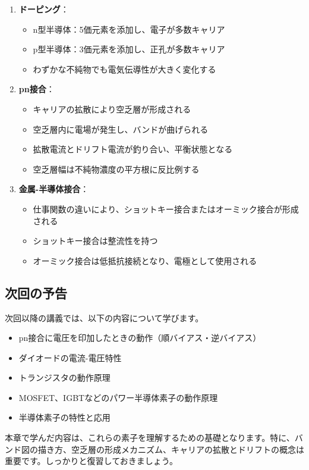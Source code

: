 \begin{enumerate}
\item \textbf{ドーピング}：
\begin{itemize}
\item n型半導体：5価元素を添加し、電子が多数キャリア
\item p型半導体：3価元素を添加し、正孔が多数キャリア
\item わずかな不純物でも電気伝導性が大きく変化する
\end{itemize}

\item \textbf{pn接合}：
\begin{itemize}
\item キャリアの拡散により空乏層が形成される
\item 空乏層内に電場が発生し、バンドが曲げられる
\item 拡散電流とドリフト電流が釣り合い、平衡状態となる
\item 空乏層幅は不純物濃度の平方根に反比例する
\end{itemize}

\item \textbf{金属-半導体接合}：
\begin{itemize}
\item 仕事関数の違いにより、ショットキー接合またはオーミック接合が形成される
\item ショットキー接合は整流性を持つ
\item オーミック接合は低抵抗接続となり、電極として使用される
\end{itemize}
\end{enumerate}

\subsection{次回の予告}

次回以降の講義では、以下の内容について学びます。

\begin{itemize}
\item pn接合に電圧を印加したときの動作（順バイアス・逆バイアス）
\item ダイオードの電流-電圧特性
\item トランジスタの動作原理
\item MOSFET、IGBTなどのパワー半導体素子の動作原理
\item 半導体素子の特性と応用
\end{itemize}

本章で学んだ内容は、これらの素子を理解するための基礎となります。特に、バンド図の描き方、空乏層の形成メカニズム、キャリアの拡散とドリフトの概念は重要です。しっかりと復習しておきましょう。

